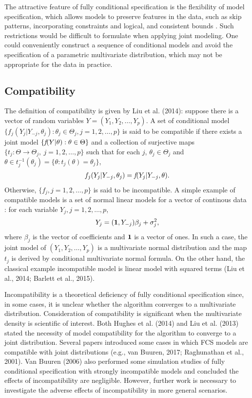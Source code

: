 \documentclass[12pt, fullpage, a4paper]{article}
\begin{document}
The attractive feature of fully conditional specification is the flexibility of model specification, which allows models to preserve features in the data, such as skip patterns, incorporating constraints and logical, and consistent bounds \cite{van2007multiple}. Such restrictions would be difficult to formulate when applying joint modeling. One could conveniently construct a sequence of conditional models and avoid the specification of a parametric multivariate distribution, which may not be appropriate for the data in practice.

\subsection{Compatibility} 
The definition of compatibility is given by Liu et al. (2014): suppose there is a vector of random variables $Y = (Y_1, Y_2, \dots, Y_p)$. A set of conditional model $\{f_{j}(Y_j|Y_{-j}, \theta_{j}) : \theta_{j} \in \Theta_{j}, j = 1, 2, \dots, p\}$ is said to be compatible if there exists a joint model $\{\emph{f}(Y|\theta) : \theta \in \Theta\}$ and a collection of surjective maps $\{t_{j} : \Theta \to \Theta_{j},\: j = 1, 2, \dots, p\}$ such that for each $j$, $\theta_{j} \in \Theta_{j}$ and $\theta \in t_{j}^{-1}(\theta_{j}) = \{\theta : t_{j}(\theta) = \theta_{j}\}$, 
\begin{gather*}
f_{j}(Y_j|Y_{-j}, \theta_{j}) = \emph{f}(Y_j|Y_{-j}, \theta).
\end{gather*}
Otherwise, $\{f_{j}, j = 1, 2, \dots, p\}$ is said to be incompatible.
A simple example of compatible models is a set of normal linear models for a vector of continous data : for each variable $Y_j, j = 1, 2, \dots, p$,
\begin{gather*}
Y_j = (\textbf1, Y_{-j})\beta_{j} + \sigma_{j}^2, 
\end{gather*}
where $\beta_{j}$ is the vector of coefficients and $\textbf1$ is a vector of ones. In such a case, the joint model of $(Y_1, Y_2, \dots, Y_p)$ is a multivariate normal distribution and the map $t_j$ is derived by conditional multivariate normal formula. On the other hand, the classical example incompatible model is linear model with squared terms (Liu et al., 2014; Barlett et al., 2015\nocite{bartlett2015multiple}).

Incompatibility is a theoretical deficiency of fully conditional specification since, in some cases, it is unclear whether the algorithm converges to a multivariate distribution. Consideration of compatibility is significant when the multivariate density is scientific of interest. Both Hughes et al. (2014) and Liu et al. (2013) stated the necessity of model compatibility for the algorithm to converge to a joint distribution. Several papers introduced some cases in which FCS models are compatible with joint distributions (e.g., van Buuren, 2017; Raghunathan et al., 2001\nocite{raghunathan2001multivariate}). Van Buuren\nocite{van2006fully} (2006) also performed some simulation studies of fully conditional specification with strongly incompatible models and concluded the effects of incompatibility are negligible. However, further work is necessary to investigate the adverse effects of incompatibility in more general scenarios. 
\end{document}
